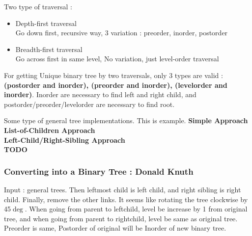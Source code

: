 \begin{section}
\noindent Two type of traversal :
\begin{itemize}
    \item Depth-first traversal \\
    Go down first, recursive way, 3 variation : preorder, inorder, postorder
    \item Breadth-first traversal \\
    Go across first in same level, No variation, just level-order traversal
\end{itemize}

\noindent
For getting Unique binary tree by two traversals, only 3 types are valid : \textbf{(postorder and inorder), (preorder and inorder), (levelorder and inorder)}. 
Inorder are necessary to find left and right child, and postorder/preorder/levelorder are necessary to find root.

\bigskip
Some type of general tree implementations. This is example. 
\medskip
\textbf{Simple Approach} \\
\textbf{List-of-Children Approach} \\
\textbf{Left-Child/Right-Sibling Approach} \\
\textbf{TODO}



\subsubsection*{Converting into a Binary Tree : Donald Knuth}
Input : general trees. Then leftmost child is left child, and right sibling is right child. Finally, remove the other links. It seems like rotating the tree clockwise by 45$\deg$. When going from parent to leftchild, level be increase by 1 from original tree, and when going from parent to rightchild, level be same as original tree. Preorder is same, Postorder of original will be Inorder of new binary tree.


\bigskip
\end{section}